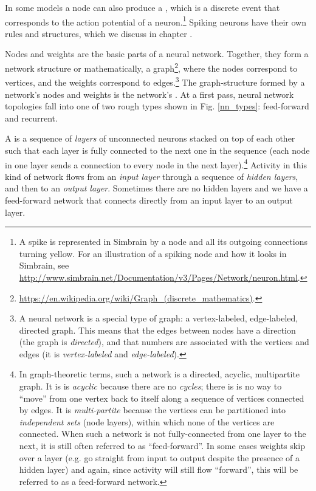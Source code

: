 In some models a node can also produce a , which is a discrete event that corresponds to the action potential of a neuron.\footnote{A spike is represented in Simbrain by a node and all its outgoing connections turning yellow. For an illustration of a spiking node and how it looks in Simbrain, see \url{http://www.simbrain.net/Documentation/v3/Pages/Network/neuron.html}.}  Spiking neurons have their own rules and structures, which we discuss in chapter .

Nodes and weights are the basic parts of a neural network. Together, they form a network structure or mathematically, a graph\footnote{\url{https://en.wikipedia.org/wiki/Graph_(discrete_mathematics)}.}, where the nodes correspond to vertices, and the weights correspond to edges.\footnote{A neural network is a special type of graph: a vertex-labeled, edge-labeled, directed graph. This means that the edges between nodes have a direction (the graph is \emph{directed}), and that numbers are associated with the vertices and edges (it is \emph{vertex-labeled} and \emph{edge-labeled}).}  The graph-structure formed by a network's nodes and weights is the network's . At a first pass, neural network topologies fall into one of two rough types shown in Fig. \ref{nn_types}: feed-forward and recurrent. 

A   is a sequence of \emph{layers} of unconnected neurons stacked on top of each other such that each layer is fully connected to the next one in the sequence (each node in one layer sends a connection to every node in the next layer).\footnote{\label{acyclic} In graph-theoretic terms, such a network is a directed, acyclic, multipartite graph. It is is \emph{acyclic} because there are no \emph{cycles}; there is is no way to ``move'' from one vertex back to itself along a sequence of vertices connected by edges. It is \emph{multi-partite} because the vertices can be partitioned into \emph{independent sets} (node layers), within which none of the vertices are connected. When such a network is not fully-connected from one layer to the next, it is still often referred to as ``feed-forward''. In some cases weights skip over a layer (e.g. go straight from input to output despite the presence of a hidden layer) and again, since activity will still flow ``forward'', this will be referred to as a feed-forward network.}  Activity in this kind of network flows from an \emph{input layer} through a sequence of \emph{hidden layers}, and then to an \emph{output layer}. Sometimes there are no hidden layers and we have a feed-forward network that connects directly from an input layer to an output layer.

